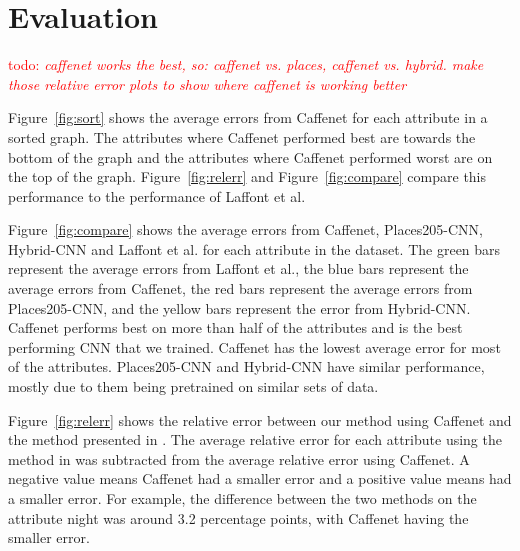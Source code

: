 \documentclass{article}
\newcommand{\todo}[1]{\textcolor{red}{todo: {\em #1}}}
\newcommand{\figref}[1]{Figure~\ref{fig:#1}}
\begin{document}


\section{Evaluation}

\todo{caffenet works the best, so: caffenet vs. places, caffenet vs. hybrid.
			make those relative error plots to show where caffenet is working better}

\figref{sort} shows the average errors from Caffenet for each attribute
in a sorted graph.  The attributes where Caffenet performed best are towards
the bottom of the graph and the attributes where Caffenet performed
worst are on the top of the graph. \figref{relerr} and \figref{compare} 
compare this performance to the performance of Laffont et al.

\figref{compare} shows the average errors from Caffenet, Places205-CNN, Hybrid-CNN
and Laffont et al. for each attribute in the dataset.  The green bars represent the 
average errors from Laffont et al., the blue bars represent the average errors from 
Caffenet, the red bars represent the average errors from Places205-CNN, and the 
yellow bars represent the error from Hybrid-CNN. Caffenet performs best on more than
half of the attributes and is the best performing CNN that we trained.  Caffenet has 
the lowest average error for most of the attributes.  Places205-CNN and Hybrid-CNN 
have similar performance, mostly due to them being pretrained on similar sets of 
data.

\figref{relerr} shows the relative error between our method using Caffenet
and the method presented in \cite{Laffont14}.  The average relative error 
for each attribute using the method in \cite{Laffont14} was subtracted from
the average relative error using Caffenet.  A negative value means Caffenet
had a smaller error and a positive value means \cite{Laffont14} had a smaller
error.  For example, the difference between the two methods on the attribute
night was around 3.2 percentage points, with Caffenet having the smaller 
error.

 
 
\end{document}
